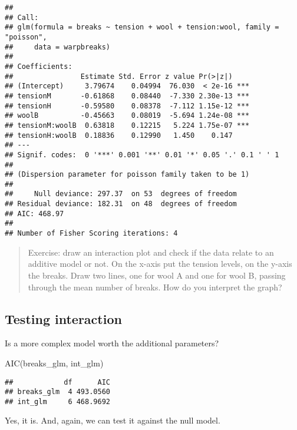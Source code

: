 \documentclass[
  oneside]{book}
\newenvironment{Shaded}{\begin{snugshade}}{\end{snugshade}}
\newcommand{\FunctionTok}[1]{\textcolor[rgb]{0.00,0.00,0.00}{#1}}
\newcommand{\NormalTok}[1]{#1}
\newcommand{\OtherTok}[1]{\textcolor[rgb]{0.56,0.35,0.01}{#1}}
\newcommand{\SpecialCharTok}[1]{\textcolor[rgb]{0.00,0.00,0.00}{#1}}
\begin{document}
\begin{verbatim}
## 
## Call:
## glm(formula = breaks ~ tension + wool + tension:wool, family = "poisson", 
##     data = warpbreaks)
## 
## Coefficients:
##                Estimate Std. Error z value Pr(>|z|)    
## (Intercept)     3.79674    0.04994  76.030  < 2e-16 ***
## tensionM       -0.61868    0.08440  -7.330 2.30e-13 ***
## tensionH       -0.59580    0.08378  -7.112 1.15e-12 ***
## woolB          -0.45663    0.08019  -5.694 1.24e-08 ***
## tensionM:woolB  0.63818    0.12215   5.224 1.75e-07 ***
## tensionH:woolB  0.18836    0.12990   1.450    0.147    
## ---
## Signif. codes:  0 '***' 0.001 '**' 0.01 '*' 0.05 '.' 0.1 ' ' 1
## 
## (Dispersion parameter for poisson family taken to be 1)
## 
##     Null deviance: 297.37  on 53  degrees of freedom
## Residual deviance: 182.31  on 48  degrees of freedom
## AIC: 468.97
## 
## Number of Fisher Scoring iterations: 4
\end{verbatim}

\begin{quote}
Exercise: draw an interaction plot and check if the data
relate to an additive model or not. On the x-axis put the tension levels, on
the y-axis the breaks. Draw two lines, one for wool A and one for wool B,
passing through the mean number of breaks. How do you interpret the graph?
\end{quote}

\hypertarget{testing-interaction}{%
\subsection{Testing interaction}\label{testing-interaction}}

Is a more complex model worth the additional parameters?

\begin{Shaded}
\begin{Highlighting}[]
\FunctionTok{AIC}\NormalTok{(breaks\_glm, int\_glm)}
\end{Highlighting}
\end{Shaded}

\begin{verbatim}
##            df      AIC
## breaks_glm  4 493.0560
## int_glm     6 468.9692
\end{verbatim}

Yes, it is. And, again, we can test it against the
null model.

\begin{Shaded}
\end{Shaded}
\end{document}
